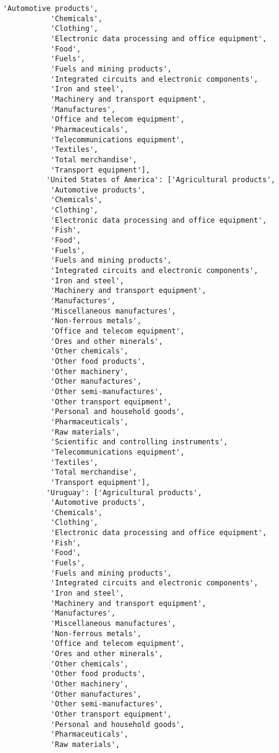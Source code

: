 \documentclass[11pt]{article}
\begin{document}
\begin{Verbatim}[commandchars=\\\{\}]
           'Automotive products',
           'Chemicals',
           'Clothing',
           'Electronic data processing and office equipment',
           'Food',
           'Fuels',
           'Fuels and mining products',
           'Integrated circuits and electronic components',
           'Iron and steel',
           'Machinery and transport equipment',
           'Manufactures',
           'Office and telecom equipment',
           'Pharmaceuticals',
           'Telecommunications equipment',
           'Textiles',
           'Total merchandise',
           'Transport equipment'],
          'United States of America': ['Agricultural products',
           'Automotive products',
           'Chemicals',
           'Clothing',
           'Electronic data processing and office equipment',
           'Fish',
           'Food',
           'Fuels',
           'Fuels and mining products',
           'Integrated circuits and electronic components',
           'Iron and steel',
           'Machinery and transport equipment',
           'Manufactures',
           'Miscellaneous manufactures',
           'Non-ferrous metals',
           'Office and telecom equipment',
           'Ores and other minerals',
           'Other chemicals',
           'Other food products',
           'Other machinery',
           'Other manufactures',
           'Other semi-manufactures',
           'Other transport equipment',
           'Personal and household goods',
           'Pharmaceuticals',
           'Raw materials',
           'Scientific and controlling instruments',
           'Telecommunications equipment',
           'Textiles',
           'Total merchandise',
           'Transport equipment'],
          'Uruguay': ['Agricultural products',
           'Automotive products',
           'Chemicals',
           'Clothing',
           'Electronic data processing and office equipment',
           'Fish',
           'Food',
           'Fuels',
           'Fuels and mining products',
           'Integrated circuits and electronic components',
           'Iron and steel',
           'Machinery and transport equipment',
           'Manufactures',
           'Miscellaneous manufactures',
           'Non-ferrous metals',
           'Office and telecom equipment',
           'Ores and other minerals',
           'Other chemicals',
           'Other food products',
           'Other machinery',
           'Other manufactures',
           'Other semi-manufactures',
           'Other transport equipment',
           'Personal and household goods',
           'Pharmaceuticals',
           'Raw materials',

\end{Verbatim}
\end{document}
